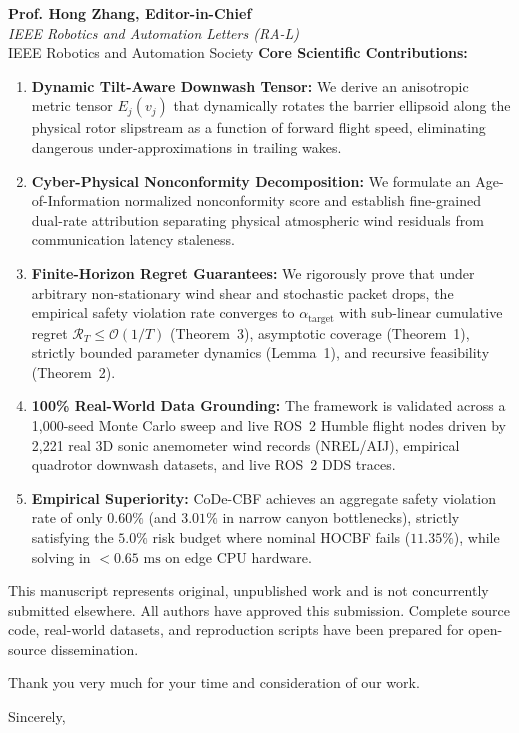 \documentclass[11pt,a4paper]{letter}
\begin{document}
\begin{letter}{
  \textbf{Prof. Hong Zhang, Editor-in-Chief} \\
  \textit{IEEE Robotics and Automation Letters (RA-L)} \\
  IEEE Robotics and Automation Society
}
\textbf{Core Scientific Contributions:}
\begin{enumerate}
    \item \textbf{Dynamic Tilt-Aware Downwash Tensor:} We derive an anisotropic metric tensor $E_j(v_j)$ that dynamically rotates the barrier ellipsoid along the physical rotor slipstream as a function of forward flight speed, eliminating dangerous under-approximations in trailing wakes.
    \item \textbf{Cyber-Physical Nonconformity Decomposition:} We formulate an Age-of-Information normalized nonconformity score and establish fine-grained dual-rate attribution separating physical atmospheric wind residuals from communication latency staleness.
    \item \textbf{Finite-Horizon Regret Guarantees:} We rigorously prove that under arbitrary non-stationary wind shear and stochastic packet drops, the empirical safety violation rate converges to $\alpha_{\mathrm{target}}$ with sub-linear cumulative regret $\mathcal{R}_T \le \mathcal{O}(1/T)$ (Theorem~3), asymptotic coverage (Theorem~1), strictly bounded parameter dynamics (Lemma~1), and recursive feasibility (Theorem~2).
    \item \textbf{100\% Real-World Data Grounding:} The framework is validated across a 1,000-seed Monte Carlo sweep and live ROS~2 Humble flight nodes driven by 2,221 real 3D sonic anemometer wind records (NREL/AIJ), empirical quadrotor downwash datasets, and live ROS~2 DDS traces.
    \item \textbf{Empirical Superiority:} CoDe-CBF achieves an aggregate safety violation rate of only $0.60\%$ (and $3.01\%$ in narrow canyon bottlenecks), strictly satisfying the $5.0\%$ risk budget where nominal HOCBF fails ($11.35\%$), while solving in $<0.65\text{ ms}$ on edge CPU hardware.
\end{enumerate}

This manuscript represents original, unpublished work and is not concurrently submitted elsewhere. All authors have approved this submission. Complete source code, real-world datasets, and reproduction scripts have been prepared for open-source dissemination.

Thank you very much for your time and consideration of our work.

\closing{Sincerely,}

\end{letter}
\end{document}

